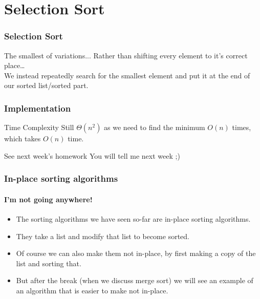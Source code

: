 \section{Selection Sort}
\label{sec:selection_sort}

\begin{frame}
	\frametitle{Selection Sort}
		\begin{block}{The smallest of variations...}
			Rather than shifting every element to it's correct place\dots\\
			\pause
			We instead repeatedly search for the smallest element and put it at the end of our sorted list/sorted part.
		\end{block}	
	\begin{center}
	
	\end{center}
\end{frame}

\begin{frame}
	\frametitle{Implementation}
	\begin{exampleblock}{Time Complexity}
		Still $\Theta(n^2)$ as we need to find the minimum $O(n)$ times, which takes $O(n)$ time.
		\end{exampleblock}	
	\begin{alertblock}{See next week's homework}
		You will tell me next week ;)
	\end{alertblock}	
\end{frame}

\begin{frame}
	\frametitle{In-place sorting algorithms}
	\framesubtitle{I'm not going anywhere!}

	\begin{itemize}
		\item The sorting algorithms we have seen so-far are \alert{in-place} sorting algorithms.
			\pause
		\item They take a list and modify that list to become sorted.
			\pause
		\item Of course we can also make them not in-place, by first making a copy of the list and sorting that.
			\pause
		\item But after the break (when we discuss merge sort) we will see an example of an algorithm that is easier to make
			not in-place.
	\end{itemize}
\end{frame}



